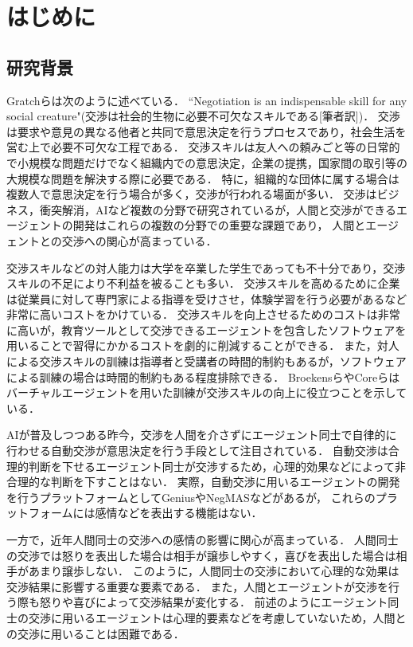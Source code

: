 

\chapter{はじめに}
\section{研究背景}
\label{sec:introduction}
Gratchら\cite{han-challenge}は次のように述べている．
``Negotiation is an indispensable skill for any social creature"(交渉は社会的生物に必要不可欠なスキルである[筆者訳])．
交渉は要求や意見の異なる他者と共同で意思決定を行うプロセスであり，社会生活を営む上で必要不可欠な工程である．
交渉スキルは友人への頼みごと等の日常的で小規模な問題だけでなく組織内での意思決定，企業の提携，国家間の取引等の大規模な問題を解決する際に必要である．
特に，組織的な団体に属する場合は複数人で意思決定を行う場合が多く，交渉が行われる場面が多い\cite{negSurvey}．
交渉はビジネス，衝突解消，AIなど複数の分野で研究されているが，人間と交渉ができるエージェントの開発はこれらの複数の分野での重要な課題であり，
人間とエージェントとの交渉への関心が高まっている\cite{han-challenge}．

交渉スキルなどの対人能力は大学を卒業した学生であっても不十分であり\cite{graduate}，交渉スキルの不足により不利益を被ることも多い．
交渉スキルを高めるために企業は従業員に対して専門家による指導を受けさせ，体験学習を行う必要があるなど非常に高いコストをかけている\cite{nego-teach}．
交渉スキルを向上させるためのコストは非常に高いが，教育ツールとして交渉できるエージェントを包含したソフトウェアを用いることで習得にかかるコストを劇的に削減することができる．
また，対人による交渉スキルの訓練は指導者と受講者の時間的制約もあるが，ソフトウェアによる訓練の場合は時間的制約もある程度排除できる．
Broekensら\cite{vr-training}やCoreら\cite{vr-simulation}はバーチャルエージェントを用いた訓練が交渉スキルの向上に役立つことを示している．

AIが普及しつつある昨今，交渉を人間を介さずにエージェント同士で自律的に行わせる自動交渉が意思決定を行う手段として注目されている\cite{automated-negotiation}．
自動交渉は合理的判断を下せるエージェント同士が交渉するため，心理的効果などによって非合理的な判断を下すことはない．
実際，自動交渉に用いるエージェントの開発を行うプラットフォームとしてGenius\cite{genius}やNegMAS\cite{negmas}などがあるが，
これらのプラットフォームには感情などを表出する機能はない．

一方で，近年人間同士の交渉への感情の影響に関心が高まっている\cite{emotion-effect}．
人間同士の交渉では怒りを表出した場合は相手が譲歩しやすく，喜びを表出した場合は相手があまり譲歩しない\cite{emotion-hh}．
このように，人間同士の交渉において心理的な効果は交渉結果に影響する重要な要素である．
また，人間とエージェントが交渉を行う際も怒りや喜びによって交渉結果が変化する\cite{emotion-ha}．
前述のようにエージェント同士の交渉に用いるエージェントは心理的要素などを考慮していないため，人間との交渉に用いることは困難である\cite{pinocchio}．

